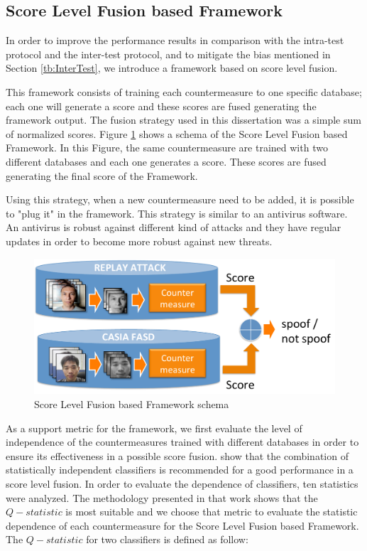 \subsection{Score Level Fusion based Framework}
\label{sec:framework}

In order to improve the performance results in comparison with the intra-test protocol and the inter-test protocol, and to mitigate the bias mentioned in Section \ref{tb:InterTest}, we introduce a framework based on score level fusion. 

This framework consists of training each countermeasure to one specific database; each one will generate a score and these scores are fused generating the framework output. The fusion strategy used in this dissertation was a simple sum of normalized scores. Figure \ref{img:fusion_framework} shows a schema of the Score Level Fusion based Framework. In this Figure, the same countermeasure are trained with two different databases and each one generates a score. These scores are fused generating the final score of the Framework. 

Using this strategy, when a new countermeasure need to be added, it is possible to "plug it" in the framework. This strategy is similar to an antivirus software. An antivirus is robust against different kind of attacks and they have regular updates in  order to become more robust against new threats.

\begin{figure}[!htb]
\begin{center}
\includegraphics [width=12cm] {images/fusion_framework.pdf}
\caption[Score Level Fusion based Framework schema]{Score Level Fusion based Framework schema} \label{img:fusion_framework}
\end{center}
\end{figure}


As a support metric for the framework, we first evaluate the level of independence of the countermeasures trained with different databases in order to ensure its effectiveness in a possible score fusion. \cite{kuncheva2003measures} show that the combination of statistically independent classifiers is recommended for a good performance in a score level fusion. In order to evaluate the dependence of classifiers, ten statistics were analyzed. The methodology presented in that work shows that the $Q-statistic$ is most suitable and we choose that metric to evaluate the statistic dependence of each countermeasure for the Score Level Fusion based Framework. The $Q-statistic$ for two classifiers is defined as follow:

